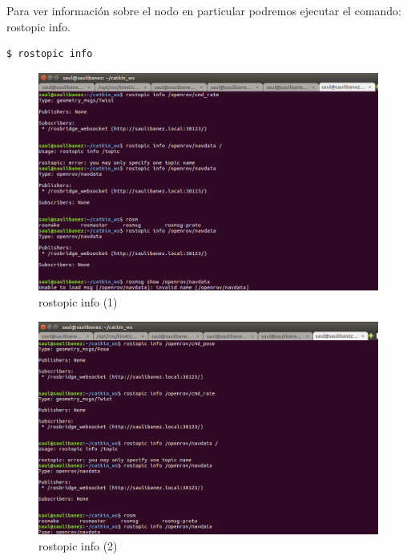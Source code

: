 Para ver información sobre el nodo en particular podremos ejecutar el comando: rostopic info.
\begin{lstlisting}[caption=rostopic info, label={lst:info}]
	$ rostopic info
\end{lstlisting}

\begin{figure} [hbtp]
  \begin{center}
    \includegraphics[width=12cm]{img/cap4/info1}
  \end{center}
  \caption{rostopic info (1)}
  \label{fig:rostopic_info}
\end{figure}
\begin{figure} [hbtp]
  \begin{center}
    \includegraphics[width=12cm]{img/cap4/info2}
  \end{center}
  \caption{rostopic info (2)}
  \label{fig:rostopic_info}
\end{figure}